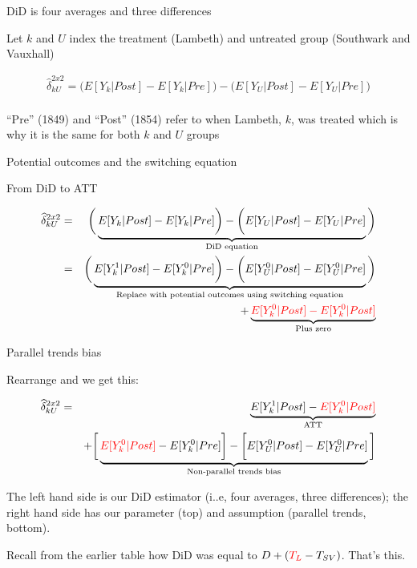 \documentclass{beamer}
\begin{document}
\begin{frame}{DiD is four averages and three differences}

Let $k$ and $U$ index the treatment (Lambeth) and untreated group (Southwark and Vauxhall)

\begin{eqnarray*}
\widehat{\delta}^{2x2}_{kU} = \bigg ( E[Y_k|Post] - E[Y_k|Pre] \bigg ) - \bigg ( E[Y_U | Post ] - E[ Y_U | Pre] \bigg) \\
\end{eqnarray*}

\bigskip

``Pre'' (1849) and ``Post'' (1854) refer to when Lambeth, $k$, was treated which is why it is the same for both $k$ and $U$ groups


\end{frame}



\begin{frame}{Potential outcomes and the switching equation}

From DiD to ATT

\begin{eqnarray*}
\widehat{\delta}^{2x2}_{kU} &=&  \bigg ( \underbrace{E[Y_k|Post] - E[Y_k|Pre] \bigg ) - \bigg ( E[Y_U | Post ] - E[ Y_U | Pre]}_{\mathclap{\text{DiD equation}}} \bigg)  \\
&=& \bigg ( \underbrace{E[Y^1_k|Post] - E[Y^0_k|Pre] \bigg ) - \bigg ( E[Y^0_U | Post ] - E[ Y^0_U | Pre]}_{\mathclap{\text{Replace with potential outcomes using switching equation}}} \bigg)  \\
&&+ \underbrace{\textcolor{red}{E[Y_k^0 |Post] - E[Y^0_k | Post]}}_{\mathclap{\text{Plus zero}}} 
\end{eqnarray*}

\end{frame}

\begin{frame}{Parallel trends bias}

Rearrange and we get this:

\begin{eqnarray*}
\widehat{\delta}^{2x2}_{kU} &=& \underbrace{E[Y^1_k | Post] - \textcolor{red}{E[Y^0_k | Post]}}_{\mathclap{\text{ATT}}} \\
&& + \bigg [  \underbrace{\textcolor{red}{E[Y^0_k | Post]} - E[Y^0_k | Pre] \bigg ] - \bigg [ E[Y^0_U | Post] - E[Y_U^0 | Pre] }_{\mathclap{\text{Non-parallel trends bias}}} \bigg ]
\end{eqnarray*}

\bigskip

The left hand side is our DiD estimator (i..e, four averages, three differences); the right hand side has our parameter (top) and assumption (parallel trends, bottom).  

\bigskip

Recall from the earlier table how DiD was equal to $D+(\textcolor{red}{T_L} - T_{SV})$.  That's this.



\end{frame}
\end{document}
